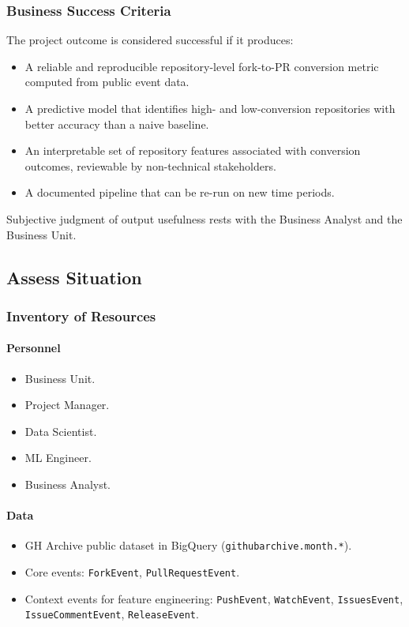 \subsubsection{Business Success Criteria}
The project outcome is considered successful if it produces:
\begin{itemize}
  \item A reliable and reproducible repository-level fork-to-PR conversion metric computed from public event data.
  \item A predictive model that identifies high- and low-conversion repositories with better accuracy than a naive baseline.
  \item An interpretable set of repository features associated with conversion outcomes, reviewable by non-technical stakeholders.
  \item A documented pipeline that can be re-run on new time periods.
\end{itemize}
Subjective judgment of output usefulness rests with the Business Analyst and the Business Unit.

\subsection{Assess Situation}

\subsubsection{Inventory of Resources}
\paragraph{Personnel}
\begin{itemize}
  \item Business Unit.
  \item Project Manager.
  \item Data Scientist.
  \item ML Engineer.
  \item Business Analyst.
\end{itemize}

\paragraph{Data}
\begin{itemize}
  \item GH Archive public dataset in BigQuery (\texttt{githubarchive.month.*}).
  \item Core events: \texttt{ForkEvent}, \texttt{PullRequestEvent}.
  \item Context events for feature engineering: \texttt{PushEvent}, \texttt{WatchEvent}, \texttt{IssuesEvent}, \texttt{IssueCommentEvent}, \texttt{ReleaseEvent}.
\end{itemize}

